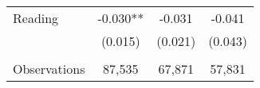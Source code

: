 {\begin{tabular}{lccc}
\hspace{3mm}Reading &      -0.030** &      -0.031   &      -0.041   \\
                    &     (0.015)   &     (0.021)   &     (0.043)   \\
                    &               &               &               \\
\hspace{3mm}Observations&      87,535   &      67,871   &      57,831   \\
 

\bottomrule
\end{tabular}
}
